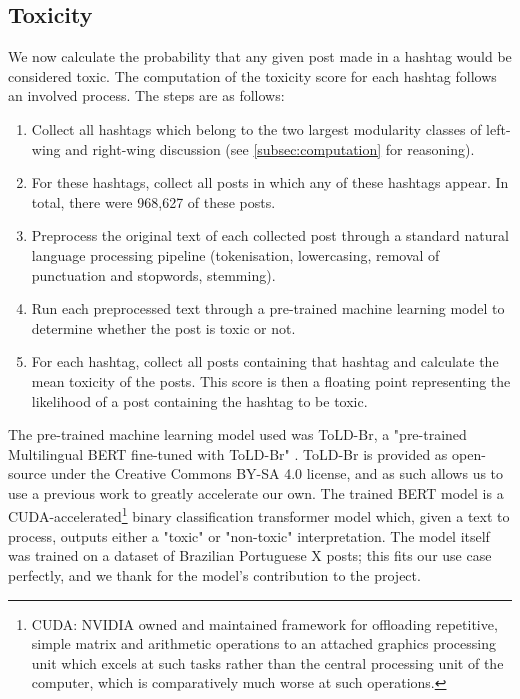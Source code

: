 \documentclass[a4paper,11pt]{article}  %
\begin{document}
	\subsection{Toxicity}
	\label{subsec:toxicity}
	We now calculate the probability that any given post made in a hashtag would be considered toxic.
	The computation of the toxicity score for each hashtag follows an involved process. The steps are as follows:
	\begin{enumerate}
		\item Collect all hashtags which belong to the two largest modularity classes of left-wing and right-wing discussion (see \autoref{subsec:computation} for reasoning).
		\item \label{step2}For these hashtags, collect all posts in which any of these hashtags appear. In total, there were 968,627 of these posts.
		\item Preprocess the original text of each collected post through a standard natural language processing pipeline (tokenisation, lowercasing, removal of punctuation and stopwords, stemming).
		\item Run each preprocessed text through a pre-trained machine learning model to determine whether the post is toxic or not.
		\item For each hashtag, collect all posts containing that hashtag and calculate the mean toxicity of the posts. This score is then a floating point representing the likelihood of a post containing the hashtag to be toxic.
	\end{enumerate}
	The pre-trained machine learning model used was ToLD-Br, a "pre-trained Multilingual BERT fine-tuned with ToLD-Br" \parencite{leiteToxicLanguageDetection2020}. ToLD-Br is provided as open-source under the Creative Commons BY-SA 4.0 license, and as such allows us to use a previous work to greatly accelerate our own. The trained BERT model is a CUDA-accelerated\footnote{CUDA: NVIDIA owned and maintained framework for offloading repetitive, simple matrix and arithmetic operations to an attached graphics processing unit which excels at such tasks rather than the central processing unit of the computer, which is comparatively much worse at such operations.} binary classification transformer model which, given a text to process, outputs either a "toxic" or "non-toxic" interpretation. The model itself was trained on a dataset of Brazilian Portuguese X posts; this fits our use case perfectly, and we thank \citeauthor{leiteToxicLanguageDetection2020} for the model's contribution to the project.
	
\end{document}
